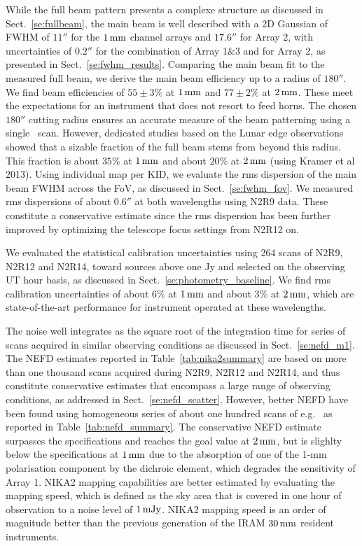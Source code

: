 While the full beam pattern presents a complexe structure as discussed
in Sect.~\ref{se:fullbeam}, the main beam is well described with a 2D
Gaussian of FWHM of $11''$ for the $1\,\rm{mm}$ channel arrays
and $17.6''$ for Array 2, with uncertainties of  $0.2''$ for the
combination of Array 1$\&$3 and for Array 2, as presented in
Sect.~\ref{se:fwhm_results}.
Comparing the main beam fit to the measured full beam, we derive the
main beam efficiency up to a radius of $180''$. We find beam
efficiencies of $55 \pm 3 \%$ at $1\,\rm{mm}$ and $77 \pm 2 \%$ at
$2\,\rm{mm}$. These meet the expectations for an instrument that does not
resort to feed horns. The chosen $180''$ cutting radius ensures an accurate
measure of the beam patterning using a single \bm\ scan. However,
dedicated studies based on the Lunar edge observations showed that
a sizable fraction of the full beam stems from beyond this
radius. This fraction is about $35\%$ at $1\,\rm{mm}$ and about $20\%$
at $2\,\rm{mm}$ (using Kramer et al 2013). Using individual map per
KID, we evaluate the rms dispersion of the main beam FWHM across the
FoV, as discussed in Sect.~\ref{se:fwhm_fov}. We measured rms
dispersions of about $0.6''$ at both wavelengths using N2R9 data. These
constitute a conservative estimate since the rms dispersion has been
further improved by optimizing the telescope focus settings from N2R12
on.  

We evaluated the statistical calibration uncertainties using 264 
scans of N2R9, N2R12 and N2R14, toward sources above one Jy and
selected on the observing UT hour basis, as discussed in
Sect.~\ref{se:photometry_baseline}. We find rms calibration
uncertainties of about $6\%$ at $1\,\rm{mm}$ and about $3\%$ at
$2\,\rm{mm}$, which are state-of-the-art performance for instrument
operated at these wavelengths. 


The noise well integrates as the square root of the integration time
for series of scans acquired in similar observing conditions as
discussed in Sect.~\ref{se:nefd_m1}. The NEFD estimates reported
in Table~\ref{tab:nika2summary} are based on more than one thousand
scans acquired during N2R9, N2R12 and N2R14, and thus constitute
conservative estimates that encompass a large range of observing
conditions, as addressed in Sect.~\ref{se:nefd_scatter}. However,
better NEFD have been found using homogeneous series of about one
hundred scans of e.g. \hls\, as reported in
Table~\ref{tab:nefd_summary}. The conservative NEFD estimate surpasses
the specifications and reaches the goal value at $2\,\rm{mm}$, but is
slighlty below the specifications at $1\,\rm{mm}$ due to the
absorption of one of the 1-mm polarisation component by the dichroic
element, which degrades the sensitivity of Array 1.
NIKA2 mapping capabilities are better estimated by evaluating the
mapping speed, which is defined as the sky area that is covered in one
hour of observation to a noise level of $1\,\rm{mJy}$. NIKA2 mapping
speed is an order of magnitude better than the previous generation of
the IRAM $30\,\rm{mm}$ resident instruments. 


